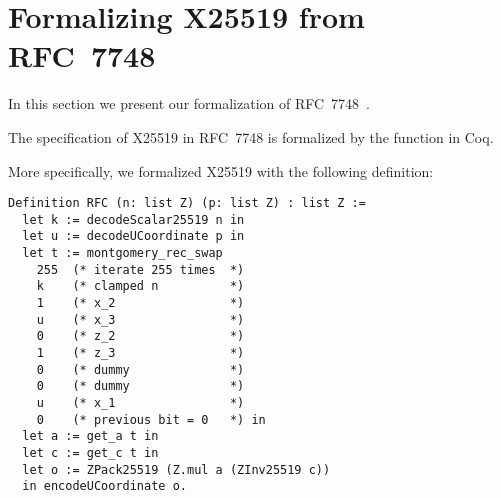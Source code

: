 \section{Formalizing X25519 from RFC~7748}
\label{sec:Coq-RFC}

In this section we present our formalization of RFC~7748~\cite{rfc7748}.

\begin{informaltheorem}
The specification of X25519 in RFC~7748 is formalized by the function  in Coq.
\end{informaltheorem}

More specifically, we formalized X25519 with the following definition:
\begin{lstlisting}[language=Coq]
Definition RFC (n: list Z) (p: list Z) : list Z :=
  let k := decodeScalar25519 n in
  let u := decodeUCoordinate p in
  let t := montgomery_rec_swap
    255  (* iterate 255 times  *)
    k    (* clamped n          *)
    1    (* x_2                *)
    u    (* x_3                *)
    0    (* z_2                *)
    1    (* z_3                *)
    0    (* dummy              *)
    0    (* dummy              *)
    u    (* x_1                *)
    0    (* previous bit = 0   *) in
  let a := get_a t in
  let c := get_c t in
  let o := ZPack25519 (Z.mul a (ZInv25519 c))
  in encodeUCoordinate o.
\end{lstlisting}

